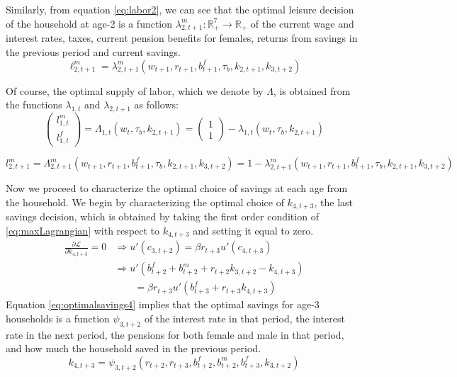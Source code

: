 \documentclass[ProjectUYA]{subfiles}
\begin{document}
Similarly, from equation \eqref{eq:labor2}, we can see that the optimal leisure decision of the household at age-2 is a function $\lambda_{2,t+1}^m:\mathbb{R}_+^7\to\mathbb{R}_+$ of the current wage and interest rates, taxes, current pension benefits for females, returns from savings in the previous period and current savings.
\begin{equation}
	\label{eq:optimalleisure2}
	\ell_{2,t+1}^m =\lambda_{2,t+1}^m(w_{t+1},r_{t+1},b_{t+1}^f, \tau_b,k_{2,t+1},k_{3,t+2})
\end{equation}

Of course, the optimal supply of labor, which we denote by $\Lambda$, is obtained from the functions $\lambda_{1,t}$ and $\lambda_{2,t+1}$ as follows:
\begin{equation}
	\label{eq:optimallabor1}
	\begin{pmatrix}
		l_{1,t}^m \\
		l_{1,t}^f
	\end{pmatrix} = \Lambda_{1,t}(w_t,\tau_b,k_{2,t+1}) =
	\begin{pmatrix}
	1\\1
	\end{pmatrix} - 
	\lambda_{1,t}(w_t,\tau_b,k_{2,t+1})
\end{equation}

\begin{equation}
	\label{eq:optimallabor2}
	l_{2,t+1}^m =\Lambda_{2,t+1}^m(w_{t+1},r_{t+1},b_{t+1}^f, \tau_b,k_{2,t+1},k_{3,t+2})=1-\lambda_{2,t+1}^m(w_{t+1},r_{t+1},b_{t+1}^f, \tau_b,k_{2,t+1},k_{3,t+2})
\end{equation}



Now we proceed to characterize the optimal choice of savings at each age from the household. We begin by characterizing the optimal choice of $k_{4,t+3}$, the last savings decision, which is obtained by taking the first order condition of \eqref{eq:maxLagrangian} with respect to $k_{4,t+3}$ and setting it equal to zero. 
\begin{equation}
	\label{eq:optimalsavings4}
	\begin{aligned}
		\frac{\partial\mathcal{L}}{\partial k_{4,t+3}}=0 & \Rightarrow u'(c_{3,t+2})=\beta r_{t+3}
		u'(c_{4,t+3}) \\
		&\Rightarrow u'\left( b_{t+2}^f+ b_{t+2}^m  + r_{t+2}k_{3,t+2} -k_{4,t+3}\right)\\
		&\qquad =\beta  r_{t+3} u'\left(b_{t+3}^f + r_{t+3}k_{4,t+3}\right)
\end{aligned}
\end{equation}
Equation \eqref{eq:optimalsavings4} implies that the optimal savings for age-3 households is a function $\psi_{3,t+2}$ of the interest rate in that period, the interest rate in the next period, the pensions for both female and male in that period, and how much the household saved in the previous period. 
\begin{equation}
	\label{eq:savingspolicy3}
	k_{4,t+3}=\psi_{3,t+2}(r_{t+2},r_{t+3},b_{t+2}^f, b_{t+2}^m,b_{t+3}^f,k_{3,t+2})
\end{equation}
\end{document}

